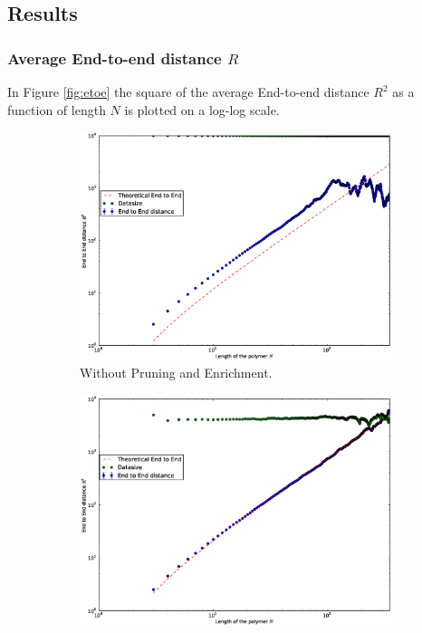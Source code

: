 \subsection*{Results}
\subsubsection*{Average End-to-end distance $R$}

In Figure \ref{fig:etoe} the square of the average End-to-end distance $R^2$ as a function of length $N$ is plotted on a log-log scale.

\begin{figure}[htb]
        \centering
        \begin{subfigure}[b]{0.45\textwidth}
                \centering
                \includegraphics[width=\textwidth]{figures/N350_I10000_E2E_RR1}
                \caption{Without Pruning and Enrichment.}
                \label{fig:etoe_noprem}
        \end{subfigure}
	\quad
        \begin{subfigure}[b]{0.45\textwidth}
                \centering
                \includegraphics[width=\textwidth]{figures/N350_E2E_PERM1}

\end{subfigure}
\end{figure}
